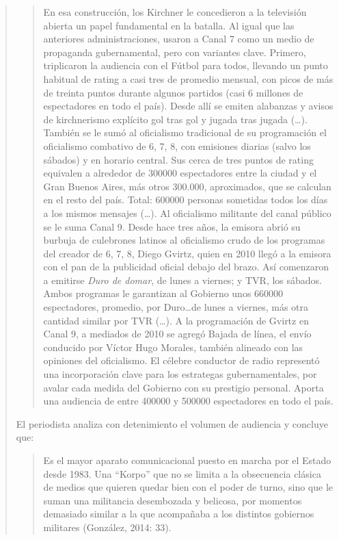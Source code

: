 \begin{quote}
\begin{quote}
	En esa construcción, los Kirchner le concedieron a la televisión abierta un papel fundamental en la batalla. Al igual que las anteriores administraciones, usaron a Canal 7 como un medio de propaganda gubernamental, pero con variantes clave. Primero, triplicaron la audiencia con el Fútbol para todos, llevando un punto habitual de rating a casi tres de promedio mensual, con picos de más de treinta puntos durante algunos partidos (casi 6 millones de espectadores en todo el país). Desde allí se emiten alabanzas y avisos de kirchnerismo explícito gol tras gol y jugada tras jugada (\dots). También se le sumó al oficialismo tradicional de su programación el oficialismo combativo de 6, 7, 8, con emisiones diarias (salvo los sábados) y en horario central. Sus cerca de tres puntos de rating equivalen a alrededor de \num{300000} espectadores entre la ciudad y el Gran Buenos Aires, más otros 300.000, aproximados, que se calculan en el resto del país. Total: \num{600000} personas sometidas todos los días a los mismos mensajes (\dots). Al oficialismo militante del canal público se le suma Canal 9. Desde hace tres años, la emisora abrió su burbuja de culebrones latinos al oficialismo crudo de los programas del creador de 6, 7, 8, Diego Gvirtz, quien en 2010 llegó a la emisora con el pan de la publicidad oficial debajo del brazo. Así comenzaron a emitirse \emph{Duro de domar}, de lunes a viernes; y TVR, los sábados. Ambos programas le garantizan al Gobierno unos \num{660000} espectadores, promedio, por Duro\dots de lunes a viernes, más otra cantidad similar por TVR (\dots). A la programación de Gvirtz en Canal 9, a mediados de 2010 se agregó Bajada de línea, el envío conducido por Víctor Hugo Morales, también alineado con las opiniones del oficialismo. El célebre conductor de radio representó una incorporación clave para los estrategas gubernamentales, por avalar cada medida del Gobierno con su prestigio personal. Aporta una audiencia de entre \num{400000} y \num{500000} espectadores en todo el país.
\end{quote}


El periodista analiza con detenimiento el volumen de audiencia y concluye que:

\begin{quote}
	Es el mayor aparato comunicacional puesto en marcha por el Estado desde 1983. Una \enquote{Korpo} que no se limita a la obsecuencia clásica de medios que quieren quedar bien con el poder de turno, sino que le suman una militancia desembozada y belicosa, por momentos demasiado similar a la que acompañaba a los distintos gobiernos militares (González, 2014: 33).
\end{quote}



\end{quote}
